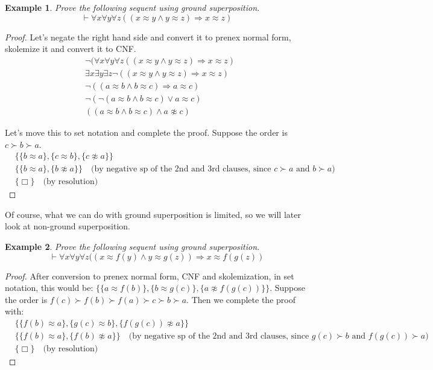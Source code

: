 \documentclass[10pt]{article}
\newtheorem{problem}{Example}
\newcommand{\imp}{\ensuremath{\Rightarrow}}
\newcommand{\set}[1]{\{#1\}}
\begin{document}
\begin{problem}
Prove the following sequent using ground superposition.
$$\vdash \forall x \forall y \forall z ((x\approx y \land y\approx z) \imp x\approx z)$$
\end{problem}

\begin{proof}
Let's negate the right hand side and convert it to prenex normal form, skolemize it and convert it to CNF.
\begin{align*}
& \lnot (\forall x \forall y \forall z ((x\approx y \land y\approx z) \imp x\approx z)\\
& \exists x \exists y \exists z \lnot ((x\approx y \land y\approx z) \imp x\approx z)\\
& \lnot ((a\approx b \land b\approx c) \imp a\approx c)\\
& \lnot (\lnot (a\approx b \land b\approx c) \lor a\approx c)\\
& ((a\approx b \land b\approx c) \land  a\not\approx c)
\end{align*}

\newpage

Let's move this to set notation and complete the proof. Suppose the order is $c \succ b \succ a$.
\begin{align*}
& \set{\set{b\approx a}, \set{c\approx b}, \set{c\not\approx a}}\\
& \set{\set{b\approx a}, \set{b\not\approx a}} \quad\text{(by negative sp of the 2nd and 3rd clauses, since $c \succ a$ and $b \succ a$)}\\
& \set{\Box} \quad\text{(by resolution)}
\end{align*}
\end{proof}

Of course, what we can do with ground superposition is limited, so we will later look at non-ground superposition.

\begin{problem}
Prove the following sequent using ground superposition.
$$\vdash \forall x \forall y \forall z ((x\approx f(y) \land y\approx g(z)) \imp x\approx f(g(z))$$
\end{problem}

\begin{proof}
After conversion to prenex normal form, CNF and skolemization, in set notation, this would be: $\set{\set{a \approx f(b)}, \set{b\approx g(c)}, \set{a \not\approx f(g(c))}}$.
Suppose the order is $f(c) \succ f(b) \succ f(a) \succ c \succ b \succ a$.
Then we complete the proof with:
\begin{align*}
& \set{\set{f(b) \approx a}, \set{g(c)\approx b}, \set{f(g(c)) \not\approx a}}\\
& \set{\set{f(b)\approx a}, \set{f(b) \not\approx a}} \quad\text{(by negative sp of the 2nd and 3rd clauses, since $g(c) \succ b$ and $f(g(c)) \succ a$)}\\
& \set{\Box} \quad\text{(by resolution)}
\end{align*}
\end{proof}
\end{document}
